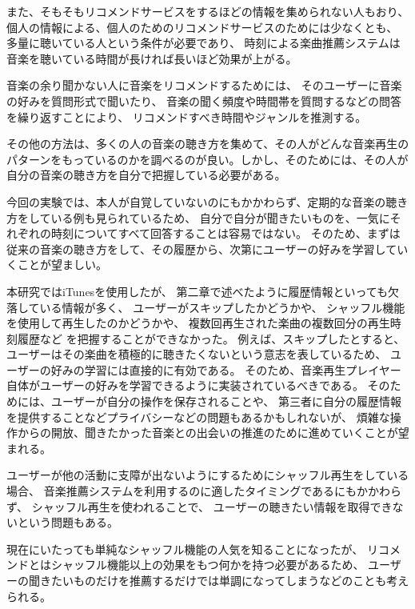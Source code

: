 \documentclass[11pt, twocolumn]{jsarticle}
\begin{document}
また、そもそもリコメンドサービスをするほどの情報を集められない人もおり、
個人の情報による、個人のためのリコメンドサービスのためには少なくとも、
多量に聴いている人という条件が必要であり、
時刻による楽曲推薦システムは音楽を聴いている時間が長ければ長いほど効果が上がる。

音楽の余り聞かない人に音楽をリコメンドするためには、
そのユーザーに音楽の好みを質問形式で聞いたり、
音楽の聞く頻度や時間帯を質問するなどの問答を繰り返すことにより、
リコメンドすべき時間やジャンルを推測する。

その他の方法は、多くの人の音楽の聴き方を集めて、その人がどんな音楽再生のパターンをもっているのかを調べるのが良い。しかし、そのためには、その人が自分の音楽の聴き方を自分で把握している必要がある。

今回の実験では、本人が自覚していないのにもかかわらず、定期的な音楽の聴き方をしている例も見られているため、
自分で自分が聞きたいものを、一気にそれぞれの時刻についてすべて回答することは容易ではない。
そのため、まずは従来の音楽の聴き方をして、その履歴から、次第にユーザーの好みを学習していくことが望ましい。

本研究ではiTunesを使用したが、
第二章で述べたように履歴情報といっても欠落している情報が多く、
ユーザーがスキップしたかどうかや、
シャッフル機能を使用して再生したのかどうかや、
複数回再生された楽曲の複数回分の再生時刻履歴など
を把握することができなかった。
例えば、スキップしたとすると、
ユーザーはその楽曲を積極的に聴きたくないという意志を表しているため、
ユーザーの好みの学習には直接的に有効である。
そのため、音楽再生プレイヤー自体がユーザーの好みを学習できるように実装されているべきである。
そのためには、ユーザーが自分の操作を保存されることや、
第三者に自分の履歴情報を提供することなどプライバシーなどの問題もあるかもしれないが、
煩雑な操作からの開放、聞きたかった音楽との出会いの推進のために進めていくことが望まれる。

ユーザーが他の活動に支障が出ないようにするためにシャッフル再生をしている場合、
音楽推薦システムを利用するのに適したタイミングであるにもかかわらず、
シャッフル再生を使われることで、
ユーザーの聴きたい情報を取得できないという問題もある。

現在にいたっても単純なシャッフル機能の人気を知ることになったが、
リコメンドとはシャッフル機能以上の効果をもつ何かを持つ必要があるため、
ユーザーの聞きたいものだけを推薦するだけでは単調になってしまうなどのことも考えられる。
\end{document}
